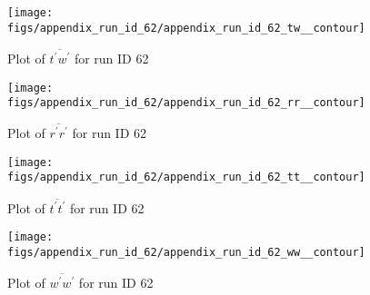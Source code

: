 \begin{figure}[H]
\centering
\texttt{[image: figs/appendix\_run\_id\_62/appendix\_run\_id\_62\_tw\_\_contour]}
\caption{Plot of $\overline{t^\prime w^\prime}$ for run ID 62}
\label{fig:appendix_run_id_62_tw__contour}
\end{figure}


\begin{figure}[H]
\centering
\texttt{[image: figs/appendix\_run\_id\_62/appendix\_run\_id\_62\_rr\_\_contour]}
\caption{Plot of $\overline{r^\prime r^\prime}$ for run ID 62}
\label{fig:appendix_run_id_62_rr__contour}
\end{figure}


\begin{figure}[H]
\centering
\texttt{[image: figs/appendix\_run\_id\_62/appendix\_run\_id\_62\_tt\_\_contour]}
\caption{Plot of $\overline{t^\prime t^\prime}$ for run ID 62}
\label{fig:appendix_run_id_62_tt__contour}
\end{figure}


\begin{figure}[H]
\centering
\texttt{[image: figs/appendix\_run\_id\_62/appendix\_run\_id\_62\_ww\_\_contour]}
\caption{Plot of $\overline{w^\prime w^\prime}$ for run ID 62}
\label{fig:appendix_run_id_62_ww__contour}
\end{figure}


